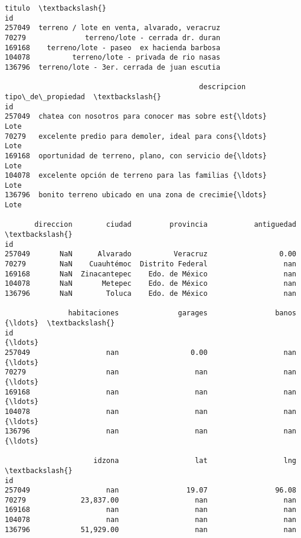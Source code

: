 \documentclass[11pt]{article}
\newcommand{\prompt}[4]{
        \llap{{\color{#2}[#3]: #4}}\vspace{-1.25em}
    }
\begin{document}
            \begin{tcolorbox}[breakable, boxrule=.5pt, size=fbox, pad at break*=1mm, opacityfill=0]
\prompt{Out}{outcolor}{13}{\hspace{3.5pt}}
\begin{Verbatim}[commandchars=\\\{\}]
                                             titulo  \textbackslash{}
id
257049  terreno / lote en venta, alvarado, veracruz
70279              terreno/lote - cerrada dr. duran
169168    terreno/lote - paseo  ex hacienda barbosa
104078          terreno/lote - privada de rio nasas
136796  terreno/lote - 3er. cerrada de juan escutia

                                              descripcion tipo\_de\_propiedad  \textbackslash{}
id
257049  chatea con nosotros para conocer mas sobre est{\ldots}              Lote
70279   excelente predio para demoler, ideal para cons{\ldots}              Lote
169168  oportunidad de terreno, plano, con servicio de{\ldots}              Lote
104078  excelente opción de terreno para las familias {\ldots}              Lote
136796  bonito terreno ubicado en una zona de crecimie{\ldots}              Lote

       direccion        ciudad         provincia           antiguedad  \textbackslash{}
id
257049       NaN      Alvarado          Veracruz                 0.00
70279        NaN    Cuauhtémoc  Distrito Federal                  nan
169168       NaN  Zinacantepec    Edo. de México                  nan
104078       NaN       Metepec    Edo. de México                  nan
136796       NaN        Toluca    Edo. de México                  nan

               habitaciones              garages                banos  {\ldots}  \textbackslash{}
id                                                                     {\ldots}
257049                  nan                 0.00                  nan  {\ldots}
70279                   nan                  nan                  nan  {\ldots}
169168                  nan                  nan                  nan  {\ldots}
104078                  nan                  nan                  nan  {\ldots}
136796                  nan                  nan                  nan  {\ldots}

                     idzona                  lat                  lng  \textbackslash{}
id
257049                  nan                19.07                96.08
70279             23,837.00                  nan                  nan
169168                  nan                  nan                  nan
104078                  nan                  nan                  nan
136796            51,929.00                  nan                  nan


\end{Verbatim}
\end{tcolorbox}
\end{document}
